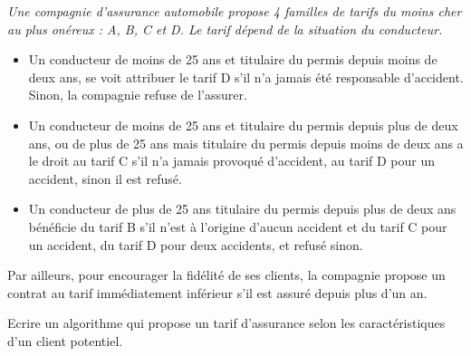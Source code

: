 \begin{td}\label{td:assurance}\em {}
Une compagnie d'assurance automobile propose 4 familles de tarifs du moins
	cher au plus onéreux : A, B, C et D. 
	Le tarif dépend de la situation du conducteur.
	\begin{itemize}
	\item Un conducteur de moins de 25 ans et titulaire du permis depuis 
		moins de deux ans, se voit attribuer le tarif D 
		s'il n'a jamais été responsable d'accident. 
		Sinon, la compagnie refuse de l'assurer.
	\item Un conducteur de moins de 25 ans et titulaire du permis depuis plus de deux ans, 
		ou de plus de 25 ans mais titulaire du permis depuis moins de deux ans 
		a le droit au tarif C s'il n'a jamais provoqué d'accident, 
		au tarif D pour un accident, sinon il est refusé.
	\item Un conducteur de plus de 25 ans titulaire du permis depuis plus de deux ans 
		bénéficie du tarif B s'il n'est à l'origine d'aucun accident 
		et du tarif C pour un accident, du tarif D pour deux accidents, 
		et refusé sinon.
	\end{itemize}
	Par ailleurs, pour encourager la fidélité de ses clients, 
	la compagnie propose un contrat au tarif immédiatement inférieur 
	s'il est assuré depuis plus d'un an.
	
	Ecrire un algorithme qui propose un tarif d'assurance selon les caractéristiques
	d'un client potentiel.
\end{td}


